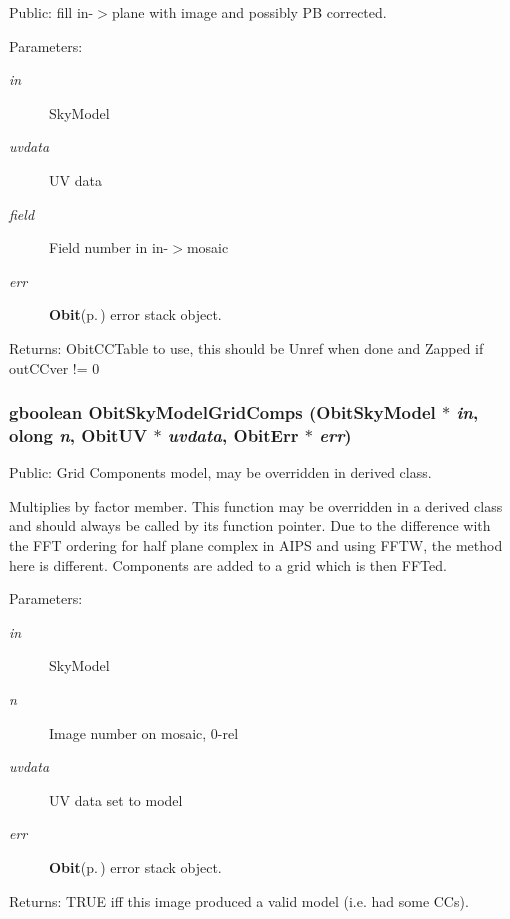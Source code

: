 Public: fill in-$>$plane with image and possibly PB corrected. 

\begin{Desc}
\item[Parameters:]
\begin{description}
\item[{\em in}]Sky\-Model \item[{\em uvdata}]UV data \item[{\em field}]Field number in in-$>$mosaic \item[{\em err}]{\bf Obit}{\rm (p.\,\pageref{structObit})} error stack object. \end{description}
\end{Desc}
\begin{Desc}
\item[Returns:]Obit\-CCTable to use, this should be Unref when done and Zapped if out\-CCver != 0 \end{Desc}
\subsubsection{\setlength{\rightskip}{0pt plus 5cm}gboolean Obit\-Sky\-Model\-Grid\-Comps ({\bf Obit\-Sky\-Model} $\ast$ {\em in}, {\bf olong} {\em n}, {\bf Obit\-UV} $\ast$ {\em uvdata}, {\bf Obit\-Err} $\ast$ {\em err})}\label{ObitSkyModel_8c_a26}


Public: Grid Components model, may be overridden in derived class. 

Multiplies by factor member. This function may be overridden in a derived class and should always be called by its function pointer. Due to the difference with the FFT ordering for half plane complex in AIPS and using FFTW, the method here is different. Components are added to a grid which is then FFTed. \begin{Desc}
\item[Parameters:]
\begin{description}
\item[{\em in}]Sky\-Model \item[{\em n}]Image number on mosaic, 0-rel \item[{\em uvdata}]UV data set to model \item[{\em err}]{\bf Obit}{\rm (p.\,\pageref{structObit})} error stack object. \end{description}
\end{Desc}
\begin{Desc}
\item[Returns:]TRUE iff this image produced a valid model (i.e. had some CCs). \end{Desc}
